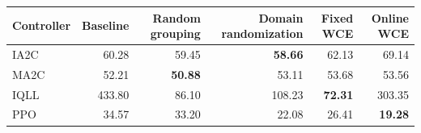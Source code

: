 \begin{tabular}{lrrrrr}
\hline
Controller & Baseline & Random grouping & Domain randomization & Fixed WCE & Online WCE \\
\hline
IA2C & 60.28 & 59.45 & \textbf{58.66} & 62.13 & 69.14 \\
MA2C & 52.21 & \textbf{50.88} & 53.11 & 53.68 & 53.56 \\
IQLL & 433.80 & 86.10 & 108.23 & \textbf{72.31} & 303.35 \\
PPO & 34.57 & 33.20 & 22.08 & 26.41 & \textbf{19.28} \\
\hline
\end{tabular}
